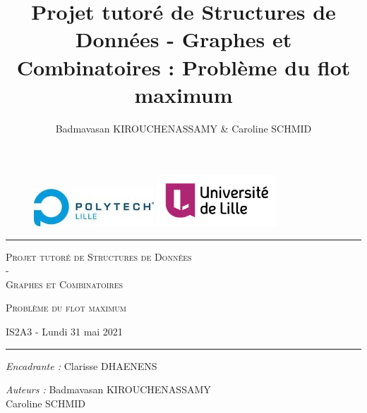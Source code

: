 \documentclass[11pt, a4paper]{report}
\author{Badmavasan KIROUCHENASSAMY \& Caroline SCHMID}
\date{}
\title{Projet tutoré de Structures de Données - Graphes et Combinatoires : Problème du flot maximum}
\begin{document}
	\begin{titlepage}
		\begin{center}

			\vspace*{1cm}

			\begin{figure}[h]
				\centering
				\includegraphics[width=0.4\textwidth]{images/LOGO_Polytech-lille.jpg}
				\hspace{2cm}
				\includegraphics[width=0.4\textwidth]{images/logo_ulille_transparent.png}
			\end{figure}

			\vspace*{2cm}

			\rule{1\textwidth}{.8pt}

			\LARGE{\textsc{Projet tutoré de Structures de Données \\-\\ Graphes et Combinatoires}}

			\vspace*{1cm}

			\LARGE{\textsc{Problème du flot maximum}}
			\vspace*{1cm}

			\small{IS2A3 - Lundi 31 mai 2021}

			\vspace*{0.5cm}
			\rule{1\textwidth}{.10pt}

			\vspace*{2.352cm}

			\large{\textit{Encadrante :} Clarisse DHAENENS}

			\vspace*{0.1cm}

			\large{\textit{Auteurs :} {Badmavasan KIROUCHENASSAMY\\Caroline SCHMID}}




		\end{center}

	\end{titlepage}
\end{document}
